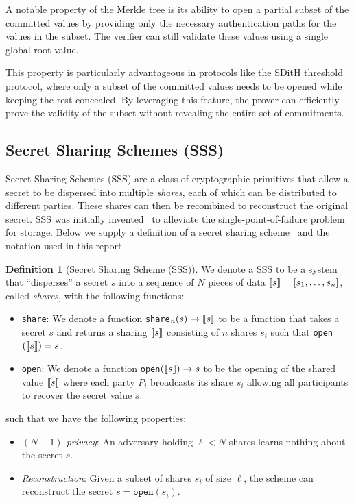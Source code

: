 \documentclass[11pt]{report}
\theoremstyle{definition}
\newtheorem{definition}{Definition}[section]
\theoremstyle{plain}
\begin{document}
A notable property of the Merkle tree is its ability to open a partial subset of the committed values by providing only the necessary authentication paths for the values in the subset. The verifier can still validate these values using a single global root value.

This property is particularly advantageous in protocols like the SDitH threshold protocol, where only a subset of the committed values needs to be opened while keeping the rest concealed. By leveraging this feature, the prover can efficiently prove the validity of the subset without revealing the entire set of commitments.

\subsection{Secret Sharing Schemes (SSS)}

Secret Sharing Schemes (SSS) are a class of cryptographic primitives that allow a secret to be dispersed into multiple \textit{shares}, each of which can be distributed to different parties. These shares can then be recombined to reconstruct the original secret. SSS was initially invented~\cite{shamir1979share} to alleviate the single-point-of-failure problem for storage. Below we supply a definition of a secret sharing scheme~\cite{cramer2015secure} and the notation used in this report.

\begin{definition}[Secret Sharing Scheme (SSS)]\label{def:ss-share}
  We denote a SSS to be a system that ``disperses'' a secret $s$ into a sequence of $N$ pieces of data $\llbracket s \rrbracket = [s_1, \dots, s_n]$, called \emph{shares}, with the following functions:
  \begin{itemize}
    \item \texttt{share}: We denote a function \texttt{share}$_n(s) \rightarrow \llbracket s \rrbracket$ to be a function that takes a secret $s$ and returns a sharing $\llbracket s \rrbracket$ consisting of $n$ shares $s_i$ such that \texttt{open}$(\llbracket s \rrbracket) = s$.
    \item \texttt{open}: We denote a function \texttt{open}$(\llbracket s \rrbracket) \rightarrow s$ to be the opening of the shared value $\llbracket s \rrbracket$ where each party $P_i$ broadcasts its share $s_i$ allowing all participants to recover the secret value $s$.
  \end{itemize}
  such that we have the following properties:
  \begin{itemize}[parsep=0pt, itemsep=0pt]
    \item \textit{$(N-1)$-privacy}: An adversary holding $\ell < N$ shares learns nothing about the secret $s$.
    \item \textit{Reconstruction}: Given a subset of shares $s_i$ of size $\ell$, the scheme can reconstruct the secret $s = \texttt{open}(s_i)$.
  \end{itemize}
\end{definition}
\end{document}
